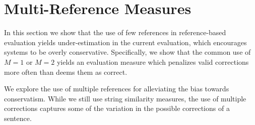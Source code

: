 \documentclass[english]{article}
\begin{document}



\section{Multi-Reference Measures}\label{sec:increase-reference}

In this section we show that the use of few references in reference-based evaluation yields
under-estimation in the current evaluation, which encourages systems to be overly conservative.
Specifically, we show that the common use of $M=1$ or $M=2$ yields an evaluation
measure which penalizes valid corrections more often than deems them as correct.

We explore the use of multiple references for alleviating the bias towards conservatism.
While we still use string similarity measures, the use of multiple corrections captures
some of the variation in the possible corrections of a sentence.

\end{document}
